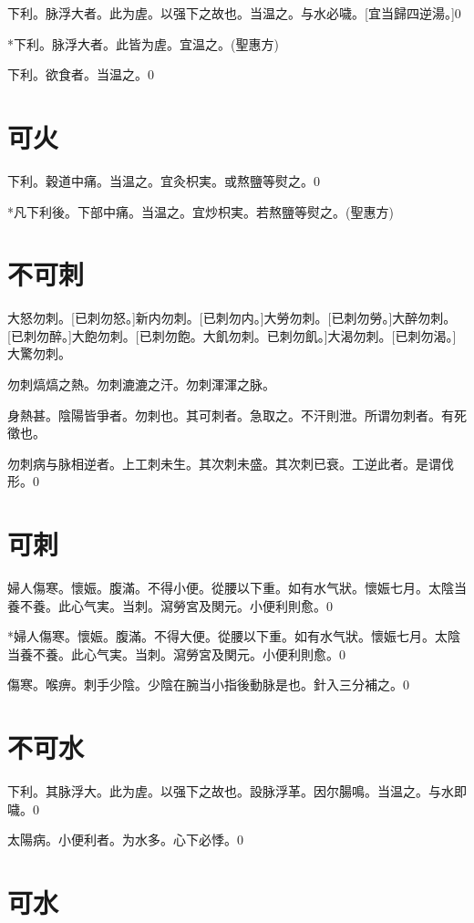 \documentclass[12pt,twoside,UTF8,b5paper]{ctexbook}
\begin{document}
下利。脉浮大者。此为虗。以强下之故也。当温之。与水必噦。[宜当歸四逆湯。]0

*下利。脉浮大者。此皆为虗。宜温之。(聖惠方)

下利。欲食者。当温之。0

\chapter{可火}

下利。穀道中痛。当温之。宜灸枳実。或熬鹽等熨之。0

*凡下利後。下部中痛。当温之。宜炒枳実。若熬鹽等熨之。(聖惠方)

\chapter{不可刺}

大怒勿刺。[已刺勿怒。]新内勿刺。[已刺勿内。]大勞勿刺。[已刺勿勞。]大醉勿刺。[已刺勿醉。]大飽勿刺。[已刺勿飽。大飢勿刺。已刺勿飢。]大渴勿刺。[已刺勿渴。]大驚勿刺。

勿刺熇熇之熱。勿刺漉漉之汗。勿刺渾渾之脉。

身熱甚。陰陽皆爭者。勿刺也。其可刺者。急取之。不汗則泄。所谓勿刺者。有死徵也。

勿刺病与脉相逆者。上工刺未生。其次刺未盛。其次刺已衰。工逆此者。是谓伐形。0

\chapter{可刺}

婦人傷寒。懷娠。腹滿。不得小便。從腰以下重。如有水气狀。懷娠七月。太陰当養不養。此心气実。当刺。瀉勞宮及関元。小便利則愈。0

*婦人傷寒。懷娠。腹滿。不得大便。從腰以下重。如有水气狀。懷娠七月。太陰当養不養。此心气実。当刺。瀉勞宮及関元。小便利則愈。0

傷寒。喉痹。刺手少陰。少陰在腕当小指後動脉是也。針入三分補之。0

\chapter{不可水}

下利。其脉浮大。此为虗。以强下之故也。設脉浮革。因尔腸鳴。当温之。与水即噦。0

太陽病。小便利者。为水多。心下必悸。0

\chapter{可水}
\end{document}
